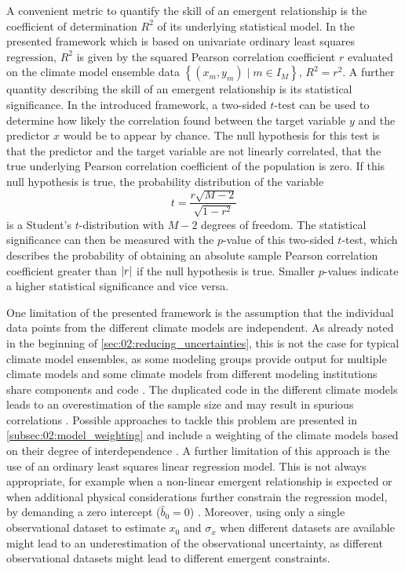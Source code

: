 A convenient metric to quantify the skill of an emergent relationship is the
coefficient of determination $R^2$ of its underlying statistical model. In the
presented framework which is based on univariate ordinary least squares
regression, $R^2$ is given by the squared Pearson correlation coefficient $r$
evaluated on the climate model ensemble data $\left\{ \left( x_m, y_m \right)
\mid m \in I_M \right\}$, \ie{} $R^2 = r^2$. A further quantity describing the
skill of an emergent relationship is its statistical significance. In the
introduced framework, a two-sided $t$-test can be used to determine how likely
the correlation found between the target variable $y$ and the predictor $x$
would be to appear by chance. The null hypothesis for this test is that the
predictor and the target variable are not linearly correlated, \ie{} that the
true underlying Pearson correlation coefficient of the population is zero. If
this null hypothesis is true, the probability distribution of the variable
\begin{equation}
  t = \frac{r \sqrt{M - 2}}{\sqrt{1 - r^2}}
  \label{eq:02:t}
\end{equation}
is a Student's $t$-distribution with $M - 2$ degrees of freedom. The
statistical significance can then be measured with the $p$-value of this
two-sided $t$-test, which describes the probability of obtaining an absolute
sample Pearson correlation coefficient greater than $\abs*{r}$ if the null
hypothesis is true. Smaller $p$-values indicate a higher statistical
significance and vice versa.

One limitation of the presented framework is the assumption that the individual
data points from the different climate models are independent. As already noted
in the beginning of \cref{sec:02:reducing_uncertainties}, this is not the case
for typical climate model ensembles, as some modeling groups provide output for
multiple climate models and some climate models from different modeling
institutions share components and code \autocite{Knutti2013}. The duplicated
code in the different climate models leads to an overestimation of the sample
size and may result in spurious correlations \autocite{Sanderson2015}. Possible
approaches to tackle this problem are presented in
\cref{subsec:02:model_weighting} and include a weighting of the climate models
based on their degree of interdependence \autocite{Knutti2017a, Sanderson2015,
  Sanderson2017}. A further limitation of this approach is the use of an
ordinary least squares linear regression model. This is not always appropriate,
for example when a non-linear emergent relationship is expected
\autocite{Nijsse2020} or when additional physical considerations further
constrain the regression model, \eg{} by demanding a zero intercept ($\hat{b}_0
= 0$) \autocite{Annan2020, JimenezdelaCuesta2019}. Moreover, using only a
single observational dataset to estimate $x_0$ and $\sigma_x$ when different
datasets are available might lead to an underestimation of the observational
uncertainty, as different observational datasets might lead to different
emergent constraints.

